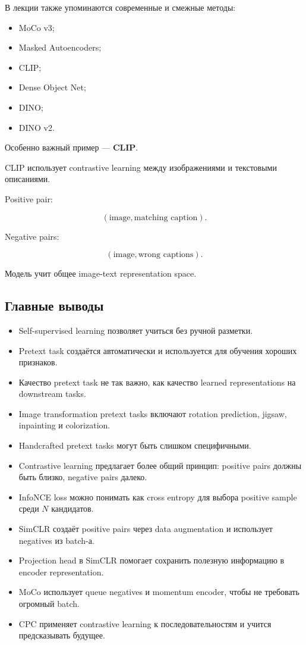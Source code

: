 \documentclass[a4paper,12pt]{article}
\begin{document}
В лекции также упоминаются современные и смежные методы:

\begin{itemize}
    \item MoCo v3;
    \item Masked Autoencoders;
    \item CLIP;
    \item Dense Object Net;
    \item DINO;
    \item DINO v2.
\end{itemize}

Особенно важный пример --- \textbf{CLIP}.

CLIP использует contrastive learning между изображениями и текстовыми описаниями.

Positive pair:

\[
(\text{image}, \text{matching caption}).
\]

Negative pairs:

\[
(\text{image}, \text{wrong captions}).
\]

Модель учит общее image-text representation space.

\subsection{Главные выводы}

\begin{itemize}
    \item Self-supervised learning позволяет учиться без ручной разметки.
    \item Pretext task создаётся автоматически и используется для обучения хороших признаков.
    \item Качество pretext task не так важно, как качество learned representations на downstream tasks.
    \item Image transformation pretext tasks включают rotation prediction, jigsaw, inpainting и colorization.
    \item Handcrafted pretext tasks могут быть слишком специфичными.
    \item Contrastive learning предлагает более общий принцип: positive pairs должны быть близко, negative pairs далеко.
    \item InfoNCE loss можно понимать как cross entropy для выбора positive sample среди \(N\) кандидатов.
    \item SimCLR создаёт positive pairs через data augmentation и использует negatives из batch-а.
    \item Projection head в SimCLR помогает сохранить полезную информацию в encoder representation.
    \item MoCo использует queue negatives и momentum encoder, чтобы не требовать огромный batch.
    \item CPC применяет contrastive learning к последовательностям и учится предсказывать будущее.
\end{itemize}
\end{document}
